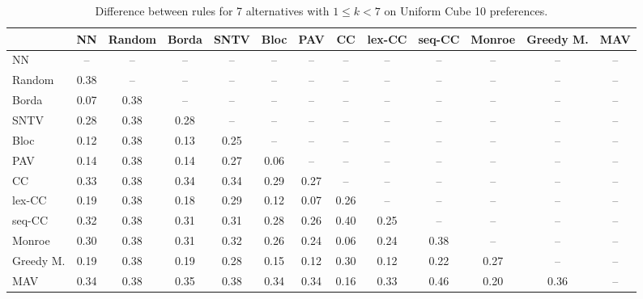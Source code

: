 
\begin{table*}[h!]
\centering
\begin{tabular}{lcccccccccccc}
\toprule
 & NN & Random & Borda & SNTV & Bloc & PAV & CC & lex-CC & seq-CC & Monroe & Greedy M. & MAV \\
\midrule
NN & -- & -- & -- & -- & -- & -- & -- & -- & -- & -- & -- & -- \\
Random & 0.38 & -- & -- & -- & -- & -- & -- & -- & -- & -- & -- & -- \\
Borda & 0.07 & 0.38 & -- & -- & -- & -- & -- & -- & -- & -- & -- & -- \\
SNTV & 0.28 & 0.38 & 0.28 & -- & -- & -- & -- & -- & -- & -- & -- & -- \\
Bloc & 0.12 & 0.38 & 0.13 & 0.25 & -- & -- & -- & -- & -- & -- & -- & -- \\
PAV & 0.14 & 0.38 & 0.14 & 0.27 & 0.06 & -- & -- & -- & -- & -- & -- & -- \\
CC & 0.33 & 0.38 & 0.34 & 0.34 & 0.29 & 0.27 & -- & -- & -- & -- & -- & -- \\
lex-CC & 0.19 & 0.38 & 0.18 & 0.29 & 0.12 & 0.07 & 0.26 & -- & -- & -- & -- & -- \\
seq-CC & 0.32 & 0.38 & 0.31 & 0.31 & 0.28 & 0.26 & 0.40 & 0.25 & -- & -- & -- & -- \\
Monroe & 0.30 & 0.38 & 0.31 & 0.32 & 0.26 & 0.24 & 0.06 & 0.24 & 0.38 & -- & -- & -- \\
Greedy M. & 0.19 & 0.38 & 0.19 & 0.28 & 0.15 & 0.12 & 0.30 & 0.12 & 0.22 & 0.27 & -- & -- \\
MAV & 0.34 & 0.38 & 0.35 & 0.38 & 0.34 & 0.34 & 0.16 & 0.33 & 0.46 & 0.20 & 0.36 & -- \\
\bottomrule
\end{tabular}

\caption{Difference between rules for 7 alternatives with $1 \leq k < 7$ on Uniform Cube 10 preferences.}
\end{table*}
